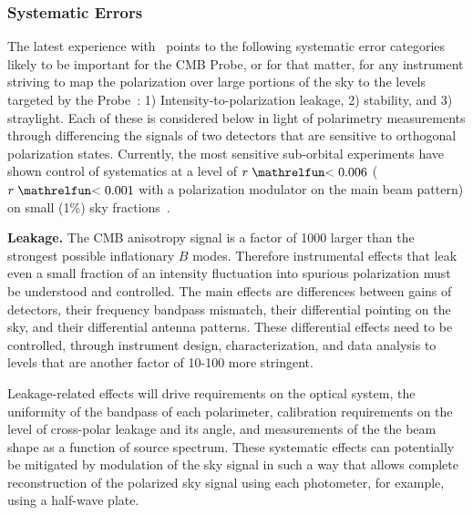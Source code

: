 
\subsubsection{Systematic Errors}
\vspace{-0.05in}

The latest experience with \planck\ points to the following systematic error categories likely to be important 
for the CMB Probe, or for that matter, for any instrument striving to map the polarization 
over large portions of the sky to the levels targeted by the Probe~\cite{planck2016_xlvi}:
1) Intensity-to-polarization leakage, 2) stability, and 3) straylight. 
Each of these is considered below in light of polarimetry measurements through
differencing the signals of two detectors that are sensitive to orthogonal polarization states. 
Currently, the most sensitive sub-orbital 
experiments have shown control of systematics at a level of $r\simlt0.006$ ($r\simlt0.001$ with 
a polarization modulator on the main beam pattern) on small (1\%) sky fractions~\cite{bicep_systematics,abs}.


\textbf{Leakage.}  The CMB anisotropy signal is a factor of 1000 larger 
than the strongest possible inflationary $B$ modes. Therefore instrumental effects that leak
even a small fraction of an intensity fluctuation into spurious polarization must be understood 
and controlled. The main effects are differences between gains of detectors, 
their frequency bandpass mismatch, their differential pointing on the sky, 
and their differential antenna patterns. 
These differential effects need to be controlled, through 
instrument design, characterization, and data analysis to levels that are another 
factor of 10-100 more stringent. 

Leakage-related effects will drive requirements on the optical system, the uniformity of the
bandpass of each polarimeter, calibration requirements on the level of cross-polar leakage and its angle,
and measurements of the the beam shape as a function of source spectrum. 
These systematic effects can potentially be mitigated by modulation of the sky signal in
such a way that allows complete reconstruction of the 
polarized sky signal using each photometer, for example, using a
half-wave plate.  

